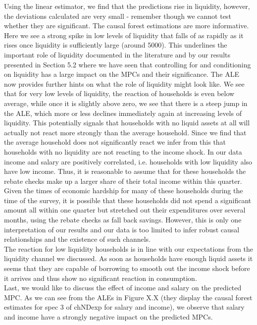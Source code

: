 Using the linear estimator, we find that the predictions rise in liquidity, however, the deviations calculated are very small - remember though we cannot test whether they are significant. The causal forest estimations are more informative. Here we see a strong spike in low levels of liquidity that falls of as rapidly as it rises once liquidity is sufficiently large (around 5000). This underlines the important role of liquidity documented in the literature and by our results presented in Section 5.2 where we have seen that controlling for and conditioning on liquidity has a large impact on the MPCs and their significance. The ALE now provides further hints on what the role of liquidity might look like. We see that for very low levels of liquidity, the reaction of households is even below average, while once it is slightly above zero, we see that there is a steep jump in the ALE, which more or less declines immediately again at increasing levels of liquidity. This potentially signals that households with no liquid assets at all will actually not react more strongly than the average household. Since we find that the average household does not significantly react we infer from this that households with no liquidity are not reacting to the income shock. In our data income and salary are positively correlated, i.e. households with low liquidity also have low income. Thus, it is reasonable to assume that for these households the rebate checks make up a larger share of their total income within this quarter. Given the times of economic hardship for many of these households during the time of the survey, it is possible that these households did not spend a significant amount all within one quarter but stretched out their expenditures over several months, using the rebate checks as fall back savings. However, this is only one interpretation of our results and our data is too limited to infer robust causal relationships and the existence of such channels. \\
The reaction for low liquidity households is in line with our expectations from the liquidity channel we discussed. As soon as households have enough liquid assets it seems that they are capable of borrowing to smooth out the income shock before it arrives and thus show no significant reaction in consumption. \\
Last, we would like to discuss the effect of income and salary on the predicted MPC. As we can see from the ALEs in Figure X.X (they display the causal forest estimates for spec 3 of chNDexp for salary and income), we observe that salary and income have a strongly negative impact on the predicted MPCs. 

